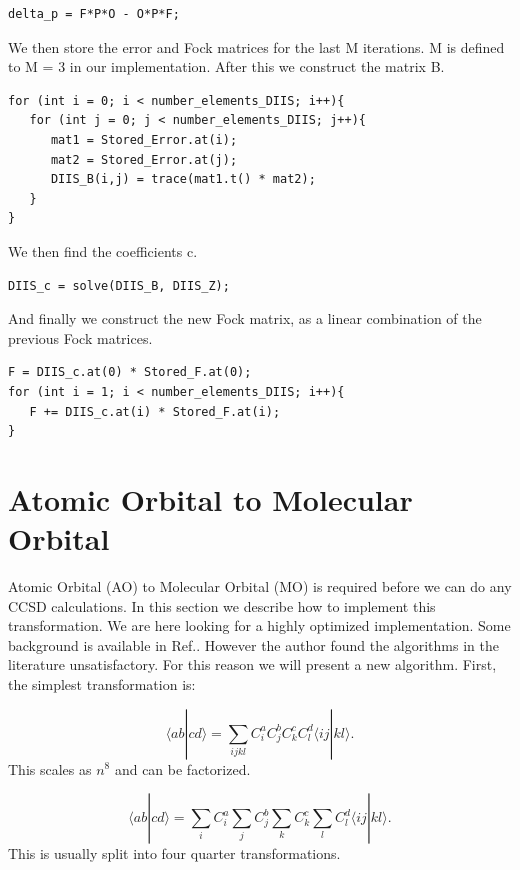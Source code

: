 \documentclass[a4paper,norsk,11pt,twoside]{report}
\begin{document}
\begin{lstlisting}
delta_p = F*P*O - O*P*F;
\end{lstlisting}

We then store the error and Fock matrices for the last M iterations. M is defined to M = 3 in our implementation. After this we construct the matrix B. 

\begin{lstlisting}
for (int i = 0; i < number_elements_DIIS; i++){
   for (int j = 0; j < number_elements_DIIS; j++){
      mat1 = Stored_Error.at(i);
      mat2 = Stored_Error.at(j);
      DIIS_B(i,j) = trace(mat1.t() * mat2);
   }
}
\end{lstlisting}

We then find the coefficients c.

\begin{lstlisting}
DIIS_c = solve(DIIS_B, DIIS_Z);
\end{lstlisting}

And finally we construct the new Fock matrix, as a linear combination of the previous Fock matrices. 

\begin{lstlisting}
F = DIIS_c.at(0) * Stored_F.at(0);
for (int i = 1; i < number_elements_DIIS; i++){
   F += DIIS_c.at(i) * Stored_F.at(i);
}
\end{lstlisting}

\newpage

\section{Atomic Orbital to Molecular Orbital}
Atomic Orbital (AO) to Molecular Orbital (MO) is required before we can do any CCSD calculations. In this section we describe how to implement this transformation. We are here looking for a highly optimized implementation. Some background is available in Ref.\cite{aotomo_1_cite}. However the author found the algorithms in the literature unsatisfactory. For this reason we will present a new algorithm. First, the simplest transformation is:

\begin{equation}
\langle ab | cd \rangle = \sum_{ijkl} C_i^a C_j^b C_k^c C_l^d \langle ij|kl \rangle .
\end{equation}
This scales as $n^8$ and can be factorized. 

\begin{equation}
\langle ab | cd \rangle = \sum_i C_i^a \sum_j C_j^b \sum_k C_k^c \sum_l C_l^d  \langle ij|kl \rangle .
\end{equation}
This is usually split into four quarter transformations. 
\end{document}
